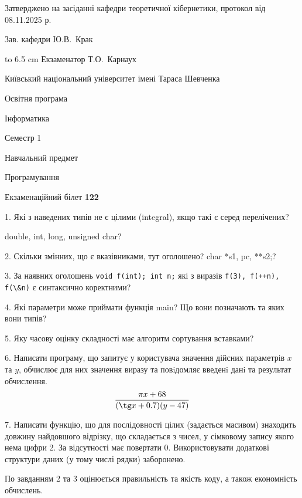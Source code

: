 \documentclass[12pt, ukrainian]{article}
\def\code#1{\Verb!#1!}
\begin{document}
{\smallskip\smallskip \begin {scriptsize} Затверджено на засіданні кафедри теоретичної кібернетики, протокол   від   08.11.2025 р.\par\smallskip\smallskip\smallskip\smallskip
{\parbox {6.5 cm} {Зав. кафедри \dotfill Ю.В.~Крак}}\hspace {0.7cm} {\hbox to 6.5 cm { Екзаменатор \dotfill Т.О.~Карнаух}} \end{scriptsize}}
\vspace{0.9cm}
{{\begin {scriptsize}\par
{ \center  Київський національний університет імені Тараса Шевченка \par}
{\parbox {5 cm}{Освітня програма \hfill}{\parbox {7 cm}{Інформатика\hfill}}\parbox {6 cm}{\hfill Семестр 1}}\par
{\parbox {5 cm} {Навчальний предмет \hfill}\parbox {7 cm}{Програмування \hfill}\parbox {6cm}{\hfill}\par}\vspace{-15pt} \end{scriptsize}}{\center Екзаменаційний білет \No \textbf { 122 }\par}}
{%
1. Які з наведених типів не є цілими (integral), якщо такі є серед перелічених?

double, int, long, unsigned char?
\par
\vspace{2mm}
2. Скільки змінних, що є вказівниками, тут оголошено?
char *s1, pc, **s2;?
\par
\vspace{2mm}
3. За наявних оголошень \code{void f(int); int n;} які з виразів \code{f(3), f(++n), f(\&n)} є синтаксично коректними?
\par
\vspace{2mm}
4. Які параметри може приймати функція main? Що вони позначають та яких вони типів?
\par
\vspace{2mm}
5. Яку часову оцінку складності має алгоритм сортування вставками?
\par
\vspace{2mm}
6. Написати програму, що запитує у користувача значення дійсних параметрів $x$ та $y$, обчислює для них значення виразу та повiдомляє введенi данi та результат обчислення.
$$\frac{\pi x + 68}{(\tg x + 0.7) (y - 47)}$$ 

\par
7. Написати функцію, що для послідовності цілих (задається масивом) знаходить довжину найдовшого відрізку, що складається з чисел, у сімковому запису якого нема цифри 2. За відсутності має повертати $0$. Використовувати додаткові структури даних (у тому числі рядки) заборонено.

По завданням 2 та 3 оцінюється правильність та якість коду, а також економність обчислень.

}
\end{document}
